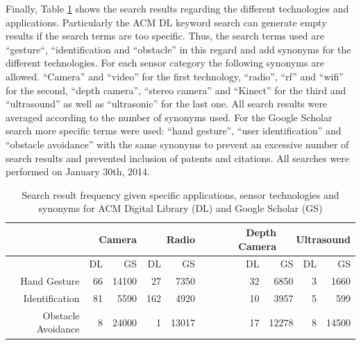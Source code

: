 Finally, Table \ref{tab:bench_search_res} shows the search results regarding the different technologies and applications. Particularly the ACM DL keyword search can generate empty results if the search terms are too specific. Thus, the search terms used are “gesture“, “identification and “obstacle” in this regard and add synonyms for the different technologies. For each sensor category the following synonyms are allowed. “Camera” and “video” for the first technology, “radio”, “rf” and “wifi” for the second, “depth camera”, “stereo camera” and “Kinect” for the third and “ultrasound” as well as “ultrasonic” for the last one. All search results were averaged according to the number of synonyms used. For the Google Scholar search more specific terms were used: “hand gesture”, “user identification” and “obstacle avoidance” with the same synonyms to prevent an excessive number of search results and prevented inclusion of patents and citations. All searches were performed on January 30th, 2014.
\begin{table}[htbp]
  \centering
  \caption{Search result frequency given specific applications, sensor technologies and synonyms for ACM Digital Library (DL) and Google Scholar (GS)}
    \begin{tabular}{rrrrrrrrrr}
    \toprule
          & \multicolumn{2}{r}{Camera} & \multicolumn{2}{r}{Radio} & \multicolumn{2}{r}{Depth Camera} & \multicolumn{3}{r}{Ultrasound} \\
    \midrule
          & DL    & GS    & DL    & GS    & DL    & \multicolumn{2}{r}{GS} & DL    & GS \\
    Hand Gesture & 66    & 14100 & 27    & 7350  & 32    & \multicolumn{2}{r}{6850} & 3     & 1660 \\
    Identification & 81    & 5590  & 162   & 4920  & 10    & \multicolumn{2}{r}{3957} & 5     & 599 \\
    Obstacle Avoidance & 8     & 24000 & 1     & 13017 & 17    & \multicolumn{2}{r}{12278} & 8     & 14500 \\
    \bottomrule
    \end{tabular}%
  \label{tab:bench_search_res}%
\end{table}%

